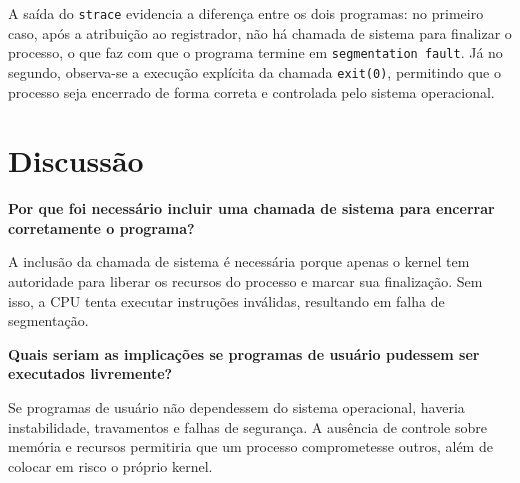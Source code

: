 \documentclass[12pt]{article}
\begin{document}
A saída do \texttt{strace} evidencia a diferença entre os dois programas: no primeiro caso, 
após a atribuição ao registrador, não há chamada de sistema para finalizar o processo, o que 
faz com que o programa termine em \texttt{segmentation fault}. Já no segundo, observa-se a 
execução explícita da chamada \texttt{exit(0)}, permitindo que o processo seja encerrado de 
forma correta e controlada pelo sistema operacional.



\section*{Discussão}


\textbf{Por que foi necessário incluir uma chamada de sistema para encerrar corretamente o programa?}  

A inclusão da chamada de sistema é necessária porque apenas o kernel tem autoridade para
liberar os recursos do processo e marcar sua finalização. Sem isso, a CPU tenta executar
instruções inválidas, resultando em falha de segmentação.  

\textbf{Quais seriam as implicações se programas de usuário pudessem ser executados livremente?}  

Se programas de usuário não dependessem do sistema operacional, haveria instabilidade,
travamentos e falhas de segurança. A ausência de controle sobre memória e recursos
permitiria que um processo comprometesse outros, além de colocar em risco o próprio kernel.  
\end{document}
